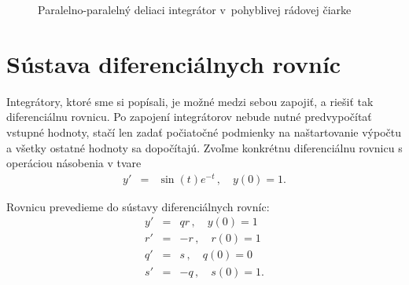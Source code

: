 \begin{figure}[h]
\centering
{}
\caption{Paralelno-paralelný deliaci integrátor v~pohyblivej rádovej čiarke}
\label{ppdi_fp}
\end{figure}
\bigskip

\newpage
\section{Sústava diferenciálnych rovníc} \label{navrhSustava}
Integrátory, ktoré sme si popísali, je možné medzi sebou zapojiť, a riešiť tak diferenciálnu rovnicu. Po zapojení integrátorov nebude nutné predvypočítať vstupné hodnoty, stačí len zadať počiatočné podmienky na naštartovanie výpočtu a všetky ostatné hodnoty sa dopočítajú.
Zvoľme konkrétnu diferenciálnu rovnicu s operáciou násobenia v tvare
\begin{eqnarray}
y' & = & \sin(t) e^{-t} \, , \quad y(0) = 1 . \label{dif_sint_et}
\end{eqnarray}
\bigskip

Rovnicu prevedieme do sústavy diferenciálnych rovníc:
\begin{eqnarray}
y' & = & qr \, , \quad y(0) = 1 \nonumber \\
r' & = & -r \, , \quad r(0) = 1 \\
q' & = & s \, , \quad q(0) = 0 \nonumber \\
s' & = & -q \, , \quad s(0) = 1 . \nonumber
\end{eqnarray}


